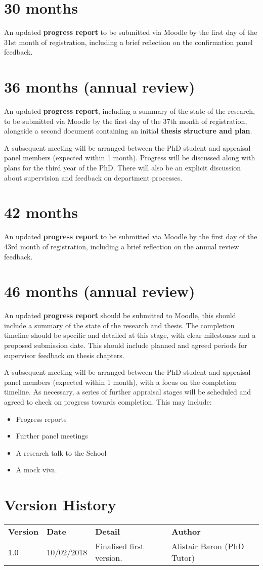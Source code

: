 \documentclass[12pt,a4paper]{article}
\begin{document}
\section{30 months}
An updated \textbf{progress report} to be submitted via Moodle by the first day of the 31st month of registration, including a brief reflection on the confirmation panel feedback.


\section{36 months (annual review)}
An updated \textbf{progress report}, including a summary of the state of the research, to be submitted via Moodle by the first day of the 37th month of registration, alongside a second document containing an initial \textbf{thesis structure and plan}.

A subsequent meeting will be arranged between the PhD student and appraisal panel members (expected within 1 month). Progress will be discussed along with plans for the third year of the PhD. There will also be an explicit discussion about supervision and feedback on department processes.


\section{42 months}
An updated \textbf{progress report} to be submitted via Moodle by the first day of the 43rd month of registration, including a brief reflection on the annual review feedback.


\section{46 months (annual review)}
An updated \textbf{progress report} should be submitted to Moodle, this should include a summary of the state of the research and thesis. The completion timeline should be specific and detailed at this stage, with clear milestones and a proposed submission date. This should include planned and agreed periods for supervisor feedback on thesis chapters.

A subsequent meeting will be arranged between the PhD student and appraisal panel members (expected within 1 month), with a focus on the completion timeline. As necessary, a series of further appraisal stages will be scheduled and agreed to check on progress towards completion. This may include:
\begin{itemize}
	\item Progress reports
	\item Further panel meetings
	\item A research talk to the School
	\item A mock viva.
\end{itemize}


\section{Version History}
\begin{tabularx}{\textwidth}{llXX}
	\textbf{Version} & \textbf{Date} & \textbf{Detail} & \textbf{Author} \\ 
	1.0 & 10/02/2018 & Finalised first version. & Alistair Baron (PhD Tutor) \\ 
\end{tabularx} 
\end{document}
